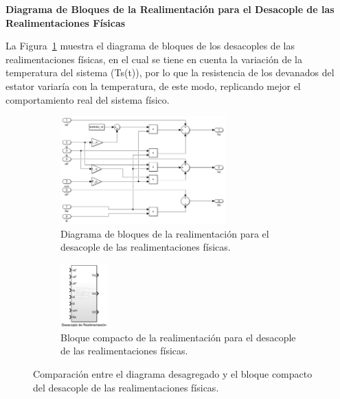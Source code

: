 \documentclass{article}
\begin{document}
\textbf{Diagrama de Bloques de la Realimentación para el Desacople de las Realimentaciones Físicas}

La Figura~\ref{fig:modulador_torque} muestra el diagrama de bloques de los desacoples de las realimentaciones físicas, en el cual se tiene en cuenta la variación de la temperatura del sistema (Ts(t)), por lo que la resistencia de los devanados del estator variaría con la temperatura, de este modo, replicando mejor el comportamiento real del sistema físico.

\begin{figure}[H]
    \centering
    \begin{subfigure}[t]{\textwidth}
        \centering
        \includegraphics[width=0.7\textwidth]{Imagenes/modulador_torque_desacople_realimentaciones.png}
        \caption{Diagrama de bloques de la realimentación para el desacople de las realimentaciones físicas.}
        \label{fig:modulador_torque}
    \end{subfigure}
    
    \vspace{0.5cm} %
    
    \begin{subfigure}[t]{\textwidth}
        \centering
        \includegraphics[width=0.2\textwidth]{Imagenes/modulador_torque_desacople_realimentaciones_compacto.png}
        \caption{Bloque compacto de la realimentación para el desacople de las realimentaciones físicas.}
        \label{fig:modulador_torque_desacople_realimentaciones_compacto}
    \end{subfigure}
    
    \caption{Comparación entre el diagrama desagregado y el bloque compacto del desacople de las realimentaciones físicas.}
    \label{fig:modulador_torque_desacople_realimentaciones}
\end{figure}
\end{document}
